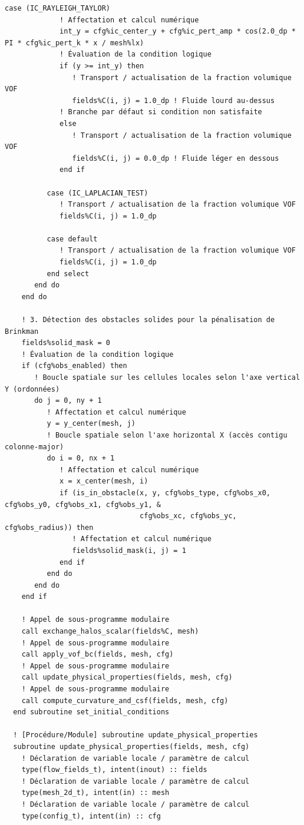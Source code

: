 \documentclass[10pt,a4paper,oneside]{book}
\begin{document}
\begin{lstlisting}[language={[95]Fortran}]
          case (IC_RAYLEIGH_TAYLOR)
             ! Affectation et calcul numérique
             int_y = cfg%ic_center_y + cfg%ic_pert_amp * cos(2.0_dp * PI * cfg%ic_pert_k * x / mesh%lx)
             ! Évaluation de la condition logique
             if (y >= int_y) then
                ! Transport / actualisation de la fraction volumique VOF
                fields%C(i, j) = 1.0_dp ! Fluide lourd au-dessus
             ! Branche par défaut si condition non satisfaite
             else
                ! Transport / actualisation de la fraction volumique VOF
                fields%C(i, j) = 0.0_dp ! Fluide léger en dessous
             end if

          case (IC_LAPLACIAN_TEST)
             ! Transport / actualisation de la fraction volumique VOF
             fields%C(i, j) = 1.0_dp

          case default
             ! Transport / actualisation de la fraction volumique VOF
             fields%C(i, j) = 1.0_dp
          end select
       end do
    end do

    ! 3. Détection des obstacles solides pour la pénalisation de Brinkman
    fields%solid_mask = 0
    ! Évaluation de la condition logique
    if (cfg%obs_enabled) then
       ! Boucle spatiale sur les cellules locales selon l'axe vertical Y (ordonnées)
       do j = 0, ny + 1
          ! Affectation et calcul numérique
          y = y_center(mesh, j)
          ! Boucle spatiale selon l'axe horizontal X (accès contigu colonne-major)
          do i = 0, nx + 1
             ! Affectation et calcul numérique
             x = x_center(mesh, i)
             if (is_in_obstacle(x, y, cfg%obs_type, cfg%obs_x0, cfg%obs_y0, cfg%obs_x1, cfg%obs_y1, &
                                cfg%obs_xc, cfg%obs_yc, cfg%obs_radius)) then
                ! Affectation et calcul numérique
                fields%solid_mask(i, j) = 1
             end if
          end do
       end do
    end if

    ! Appel de sous-programme modulaire
    call exchange_halos_scalar(fields%C, mesh)
    ! Appel de sous-programme modulaire
    call apply_vof_bc(fields, mesh, cfg)
    ! Appel de sous-programme modulaire
    call update_physical_properties(fields, mesh, cfg)
    ! Appel de sous-programme modulaire
    call compute_curvature_and_csf(fields, mesh, cfg)
  end subroutine set_initial_conditions

  ! [Procédure/Module] subroutine update_physical_properties
  subroutine update_physical_properties(fields, mesh, cfg)
    ! Déclaration de variable locale / paramètre de calcul
    type(flow_fields_t), intent(inout) :: fields
    ! Déclaration de variable locale / paramètre de calcul
    type(mesh_2d_t), intent(in) :: mesh
    ! Déclaration de variable locale / paramètre de calcul
    type(config_t), intent(in) :: cfg


\end{lstlisting}
\end{document}
